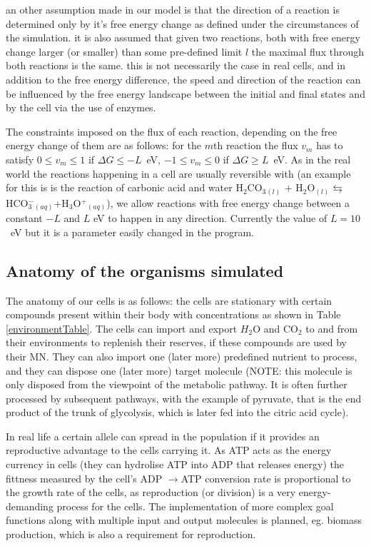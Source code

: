 \documentclass[10pt,a4paper]{article}
\begin{document}
	an other assumption made in our model is that the direction of a reaction is determined only by it's free energy change as defined under the circumstances of the simulation. it is also assumed that given two reactions, both with free energy change larger (or smaller) than some pre-defined limit $l$ the maximal flux through both reactions is the same. this is not necessarily the case in real cells, and in addition to the free energy difference, the speed and direction of the reaction can be influenced by the free energy landscape between the initial and final states and by the cell via the use of enzymes. 

	The constraints imposed on the flux of each reaction, depending on the free energy change of them are as follows: for the $m$th reaction the flux $v_m$ has to satisfy $0\leq v_m \leq 1 $ if $\Delta G \leq -L$~eV, $-1\leq v_m \leq 0 $ if $\Delta G \geq L$~eV. As in the real world the reactions happening in a cell are usually reversible with (an example for this is is the reaction of carbonic acid and water H$_2$CO$_3$$_{(l)}$ + H$_2$O$_{(l)} \leftrightarrows$ HCO$^-_3$$_{(aq)}$+H$_3$O$^+$$_{(aq)}$), we allow reactions with free energy change between a constant $-L$ and $L$ eV to happen in any direction. Currently the value of $L=10$~eV but it is a parameter easily changed in the program. 

	
	
	\subsection{Anatomy of the organisms simulated}
	\label{ssub:anatomy_of_the_oganisms_simulated}
	
	The anatomy of our cells is as follows: the cells are stationary with certain compounds present within their body with concentrations as shown in Table \ref{environmentTable}. The cells can import and export $H_2$O and CO$_2$ to and from their environments to replenish their reserves, if these compounds are used by their MN. They can also import one (later more) predefined nutrient to process, and they can dispose  one (later more) target molecule (NOTE: this molecule is only disposed from the viewpoint of the metabolic pathway. It is often further processed by subsequent pathways, with the example of pyruvate, that is the end product of the trunk of glycolysis, which is later fed into the citric acid cycle). 
	
	In real life a certain allele can spread in the population if it provides an reproductive advantage to the cells carrying it.  As ATP acts as the energy currency in cells (they can hydrolise ATP into ADP that releases energy) the fittness  measured by the cell's ADP $\rightarrow$ATP conversion rate is proportional to the growth rate of the cells, as reproduction (or division) is a very energy-demanding  process for the cells.  The implementation of more complex goal functions along with multiple input and output molecules is planned, eg. biomass production, which is also a requirement for reproduction. 
\end{document}
